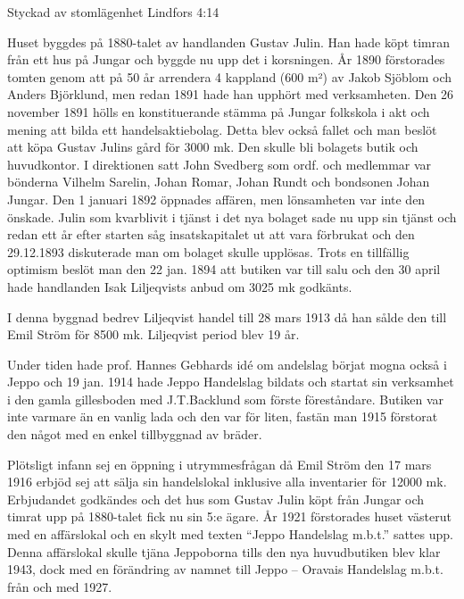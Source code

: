 Styckad av stomlägenhet Lindfors 4:14


%
Huset byggdes på 1880-talet av handlanden Gustav Julin. Han hade köpt timran från ett hus på Jungar och byggde nu upp det i korsningen. År 1890 förstorades tomten genom att på 50 år arrendera 4 kappland (600 m²) av Jakob Sjöblom och Anders Björklund, men redan 1891 hade han upphört med verksamheten. Den 26 november 1891 hölls en konstituerande stämma på Jungar folkskola i akt och mening att bilda ett handelsaktiebolag. Detta blev också fallet och man beslöt att köpa Gustav Julins gård för 3000 mk. Den skulle bli bolagets butik och huvudkontor. I direktionen satt John Svedberg som ordf. och medlemmar var bönderna Vilhelm Sarelin, Johan Romar, Johan Rundt och bondsonen Johan Jungar. Den 1 januari 1892 öppnades affären, men lönsamheten var inte den önskade. Julin som kvarblivit i tjänst i det nya bolaget sade nu upp sin tjänst och redan ett år efter starten såg insatskapitalet ut att vara förbrukat och den 29.12.1893 diskuterade man om bolaget skulle upplösas. Trots en tillfällig optimism beslöt man den 22 jan. 1894 att butiken var till salu och den 30 april hade handlanden Isak Liljeqvists anbud om 3025 mk godkänts.

I denna byggnad bedrev Liljeqvist handel till 28 mars 1913 då han sålde den till Emil Ström för 8500 mk. Liljeqvist period blev 19 år.

Under tiden hade prof. Hannes Gebhards idé om andelslag börjat mogna också i Jeppo och 19 jan. 1914 hade Jeppo Handelslag bildats och startat sin verksamhet i den gamla gillesboden med J.T.Backlund som förste föreståndare. Butiken var inte varmare än en vanlig lada och den var för liten, fastän man 1915 förstorat den något med en enkel tillbyggnad av bräder.

Plötsligt infann sej en öppning i utrymmesfrågan då Emil Ström den 17 mars 1916 erbjöd sej att sälja sin handelslokal inklusive alla inventarier för 12000 mk. Erbjudandet godkändes och det hus som Gustav Julin köpt från Jungar och timrat upp på 1880-talet fick nu sin 5:e ägare. År 1921 förstorades huset västerut med en affärslokal och en skylt med texten ``Jeppo Handelslag m.b.t.'' sattes upp. Denna affärslokal skulle tjäna Jeppoborna tills den nya huvudbutiken blev klar 1943, dock med en förändring av namnet till Jeppo – Oravais Handelslag m.b.t. från och med  1927.

